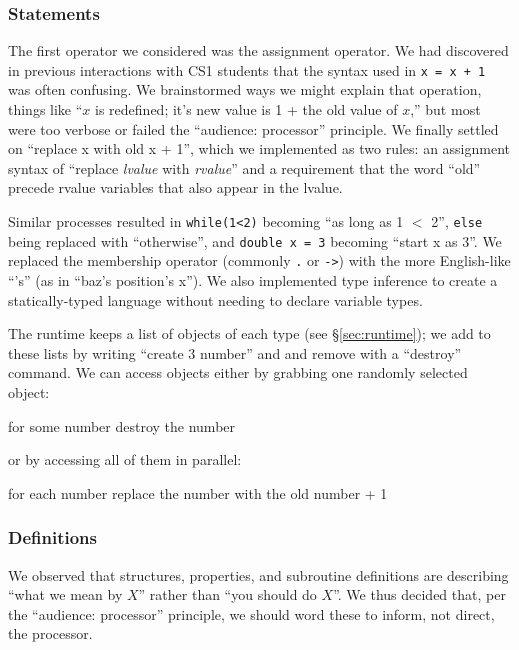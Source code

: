\documentclass{sig-alternate}
\newcommand{\INDSTATE}[1][1]{\STATE\hspace{#1\algorithmicindent}}
\newenvironment{snippet}{\begin{algorithmic}\sf}{\end{algorithmic}}
\newcommand{\code}[1]{``\textsf{#1}''}
\begin{document}
\subsubsection{Statements}
The first operator we considered was the assignment operator.
We had discovered in previous interactions with CS1 students
that the syntax used in \texttt{x = x + 1} was often confusing.
We brainstormed ways we might explain that operation,
things like ``$x$ is redefined; it's new value is 1 + the old value of $x$,''
but most were too verbose or failed the ``audience: processor'' principle.
We finally settled on \code{replace x with old x + 1},
which we implemented as two rules:
an assignment syntax of \code{replace {\it lvalue} with {\it rvalue}}
and a requirement that the word \code{old} precede rvalue variables that also appear in the lvalue.

Similar processes resulted in 
\texttt{while(1<2)} becoming \code{as long as 1 $<$ 2},
\texttt{else} being replaced with \code{otherwise}, 
and \texttt{double x = 3} becoming \code{start x as 3}.
We replaced the membership operator (commonly \texttt{.} or \mbox{\texttt{->}})
with the more English-like \code{'s} (as in \code{baz's position's x}).
We also implemented type inference to create a statically-typed language 
without needing to declare variable types.

The runtime keeps a list of objects of each type (see \S\ref{sec:runtime});
we add to these lists by writing \code{create 3 number} and and remove with a \code{destroy} command.
We can access objects either by grabbing one randomly selected object:
\begin{snippet}
\STATE for some number
\INDSTATE destroy the number
\end{snippet}
or by accessing all of them in parallel:
\begin{snippet}
\STATE for each number
\INDSTATE replace the number with the old number + 1
\end{snippet}

\subsubsection{Definitions}
We observed that structures, properties, and subroutine definitions
are describing ``what we mean by $X$'' rather than ``you should do $X$''.
We thus decided that, per the ``audience: processor'' principle, 
we should word these to inform, not direct, the processor.
\end{document}
